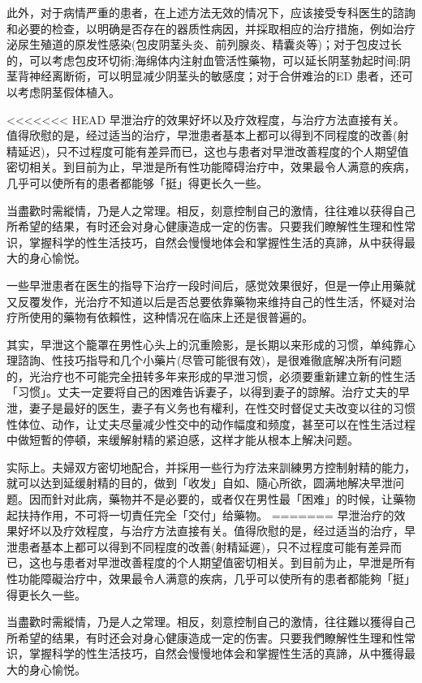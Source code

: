 \documentclass[12pt,UTF8]{ctexbook}
\begin{document}
此外，对于病情严重的患者，在上述方法无效的情况下，应该接受专科医生的諮詢和必要的检查，以明确是否存在的器质性病因，并採取相应的治疗措施，例如治疗泌尿生殖道的原发性感染(包皮阴茎头炎、前列腺炎、精囊炎等)；对于包皮过长的，可以考虑包皮环切術;海绵体内注射血管活性藥物，可以延长阴茎勃起时间;阴茎背神经离断術，可以明显减少阴茎头的敏感度；对于合併难治的ED 患者，还可以考虑阴茎假体植入。

<<<<<<< HEAD
早泄治疗的效果好坏以及疗效程度，与治疗方法直接有关。值得欣慰的是，经过适当的治疗，早泄患者基本上都可以得到不同程度的改善(射精延迟)，只不过程度可能有差异而已，这也与患者对早泄改善程度的个人期望值密切相关。到目前为止，早泄是所有性功能障碍治疗中，效果最令人满意的疾病，几乎可以使所有的患者都能够「挺」得更长久一些。

当盡歡时需縱情，乃是人之常理。相反，刻意控制自己的激情，往往难以获得自己所希望的结果，有时还会对身心健康造成一定的伤害。只要我们瞭解性生理和性常识，掌握科学的性生活技巧，自然会慢慢地体会和掌握性生活的真諦，从中获得最大的身心愉悦。

一些早泄患者在医生的指导下治疗一段时间后，感觉效果很好，但是一停止用藥就又反覆发作，光治疗不知道以后是否总要依靠藥物来维持自己的性生活，怀疑对治疗所使用的藥物有依賴性，这种情况在临床上还是很普遍的。

其实，早泄这个籠罩在男性心头上的沉重險影，是长期以来形成的习惯，单纯靠心理諮詢、性技巧指导和几个小藥片(尽管可能很有效)，是很难徹底解决所有问题的，光治疗也不可能完全扭转多年来形成的早泄习惯，必须要重新建立新的性生活「习惯」。丈夫一定要将自己的困难告诉妻子，以得到妻子的諒解。治疗丈夫的早泄，妻子是最好的医生，妻子有义务也有權利，在性交时督促丈夫改变以往的习惯性体位、动作，让丈夫尽量减少性交中的动作幅度和频度，甚至可以在性生活过程中做短暫的停頓，来缓解射精的紧迫感，这样才能从根本上解决问题。

实际上。夫婦双方密切地配合，并採用一些行为疗法来訓練男方控制射精的能力，就可以达到延缓射精的目的，做到「收发」自如、隨心所欲，圆满地解决早泄问题。因而針对此病，藥物并不是必要的，或者仅在男性最「困难」的时候，让藥物起扶持作用，不可将一切責任完全「交付」给藥物。
=======
早泄治疗的效果好坏以及疗效程度，与治疗方法直接有关。值得欣慰的是，经过适当的治疗，早泄患者基本上都可以得到不同程度的改善(射精延遲)，只不过程度可能有差异而已，这也与患者对早泄改善程度的个人期望值密切相关。到目前为止，早泄是所有性功能障礙治疗中，效果最令人满意的疾病，几乎可以使所有的患者都能夠「挺」得更长久一些。

当盡歡时需縱情，乃是人之常理。相反，刻意控制自己的激情，往往難以獲得自己所希望的结果，有时还会对身心健康造成一定的伤害。只要我們瞭解性生理和性常识，掌握科学的性生活技巧，自然会慢慢地体会和掌握性生活的真諦，从中獲得最大的身心愉悦。
\end{document}
